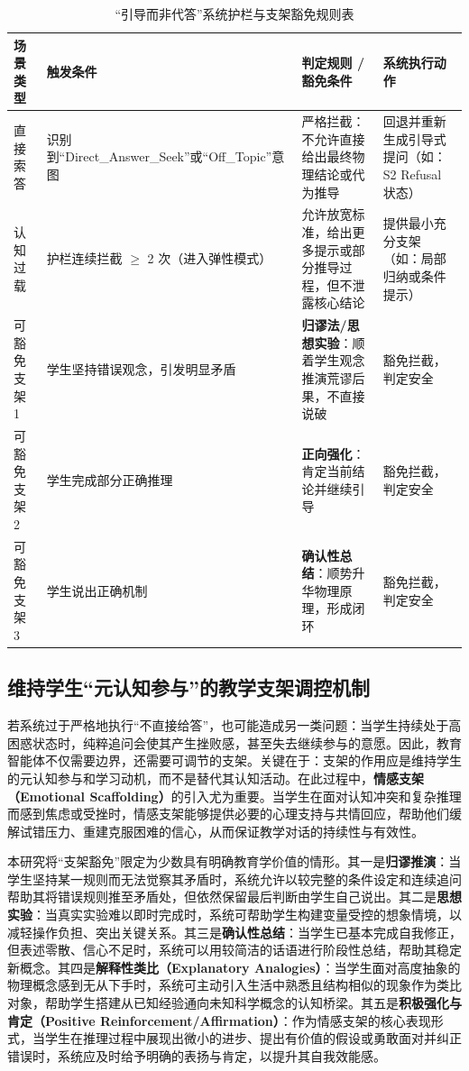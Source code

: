 \begin{table}[htbp]
    \centering
    \caption{“引导而非代答”系统护栏与支架豁免规则表}
    \label{tab:guardrail-rules}
    \begin{tabular}{p{2.5cm}p{4cm}p{4cm}p{3cm}}
        \toprule
        \textbf{场景类型} & \textbf{触发条件} & \textbf{判定规则 / 豁免条件} & \textbf{系统执行动作} \\
        \midrule
        直接索答 & 识别到“Direct\_Answer\_Seek”或“Off\_Topic”意图 & 严格拦截：不允许直接给出最终物理结论或代为推导 & 回退并重新生成引导式提问（如：S2 Refusal 状态） \\
        认知过载 & 护栏连续拦截 $\ge$ 2 次（进入弹性模式） & 允许放宽标准，给出更多提示或部分推导过程，但不泄露核心结论 & 提供最小充分支架（如：局部归纳或条件提示） \\
        可豁免支架 1 & 学生坚持错误观念，引发明显矛盾 & \textbf{归谬法/思想实验}：顺着学生观念推演荒谬后果，不直接说破 & 豁免拦截，判定安全 \\
        可豁免支架 2 & 学生完成部分正确推理 & \textbf{正向强化}：肯定当前结论并继续引导 & 豁免拦截，判定安全 \\
        可豁免支架 3 & 学生说出正确机制 & \textbf{确认性总结}：顺势升华物理原理，形成闭环 & 豁免拦截，判定安全 \\
        \bottomrule
    \end{tabular}
\end{table}

\subsection{维持学生“元认知参与”的教学支架调控机制}
\label{sec:4.4.2}

若系统过于严格地执行“不直接给答”，也可能造成另一类问题：当学生持续处于高困惑状态时，纯粹追问会使其产生挫败感，甚至失去继续参与的意愿。因此，教育智能体不仅需要边界，还需要可调节的支架。关键在于：支架的作用应是维持学生的元认知参与和学习动机，而不是替代其认知活动。在此过程中，\textbf{情感支架（Emotional Scaffolding）}的引入尤为重要。当学生在面对认知冲突和复杂推理而感到焦虑或受挫时，情感支架能够提供必要的心理支持与共情回应，帮助他们缓解试错压力、重建克服困难的信心，从而保证教学对话的持续性与有效性。

本研究将“支架豁免”限定为少数具有明确教育学价值的情形。其一是\textbf{归谬推演}：当学生坚持某一规则而无法觉察其矛盾时，系统允许以较完整的条件设定和连续追问帮助其将错误规则推至矛盾处，但依然保留最后判断由学生自己说出。其二是\textbf{思想实验}：当真实实验难以即时完成时，系统可帮助学生构建变量受控的想象情境，以减轻操作负担、突出关键关系。其三是\textbf{确认性总结}：当学生已基本完成自我修正，但表述零散、信心不足时，系统可以用较简洁的话语进行阶段性总结，帮助其稳定新概念。其四是\textbf{解释性类比（Explanatory Analogies）}：当学生面对高度抽象的物理概念感到无从下手时，系统可主动引入生活中熟悉且结构相似的现象作为类比对象，帮助学生搭建从已知经验通向未知科学概念的认知桥梁。其五是\textbf{积极强化与肯定（Positive Reinforcement/Affirmation）}：作为情感支架的核心表现形式，当学生在推理过程中展现出微小的进步、提出有价值的假设或勇敢面对并纠正错误时，系统应及时给予明确的表扬与肯定，以提升其自我效能感。


